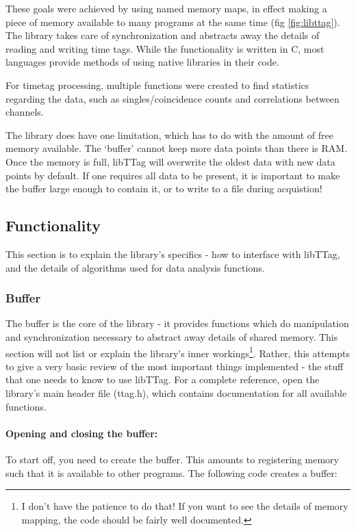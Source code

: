 \documentclass[10pt]{article}
\begin{document}
These goals were achieved by using named memory maps, in effect making a piece of memory available to many programs at the same time (fig \ref{fig:libttag}). The library takes care
of synchronization and abstracts away the details of reading and writing time tags. While the functionality
is written in C, most languages provide methods of using native libraries in their code.

For timetag processing, multiple functions were created to find statistics regarding the data, such as singles/coincidence counts and correlations between channels.

The library does have one limitation, which has to do with the amount of free memory available. The `buffer' cannot
keep more data points than there is RAM. Once the memory is full, libTTag will overwrite the oldest data
with new data points by default. If one requires all data to be present, it is important to make the buffer
large enough to contain it, or to write to a file during acquistion!

\subsection{Functionality}
This section is to explain the library's specifics - how to interface with libTTag, and the details of 
algorithms used for data analysis functions. 

\subsubsection{Buffer}
The buffer is the core of the library - it provides functions which do manipulation and synchronization necessary to abstract away details of shared memory. This section will not list or explain the library's inner workings\footnote{I don't have the patience
to do that! If you want to see the details of memory mapping, the code should be fairly well documented.}. Rather, this attempts to give a very basic review
of the most important things implemented - the stuff that one needs to know to use libTTag. For a complete reference,
open the library's main header file (ttag.h), which contains documentation for all available functions.



\paragraph{Opening and closing the buffer:}
To start off, you need to create the buffer. This amounts to registering memory such that it is available to other programs. The following code creates a buffer:
\end{document}

